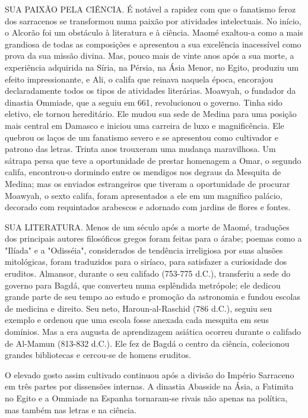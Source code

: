 \documentclass[11pt,a5paper,twoside,openany]{book}
\begin{document}
SUA PAIXÃO PELA CIÊNCIA. É notável a rapidez com que o fanatismo feroz dos sarracenos se transformou numa paixão por atividades intelectuais. No início, o Alcorão foi um obstáculo à literatura e à ciência. Maomé exaltou-a como a mais grandiosa de todas as composições e apresentou a sua excelência inacessível como prova da sua missão divina. Mas, pouco mais de vinte anos após a sua morte, a experiência adquirida na Síria, na Pérsia, na Ásia Menor, no Egito, produziu um efeito impressionante, e Ali, o califa que reinava naquela época, encorajou declaradamente todos os tipos de atividades literárias. Moawyah, o fundador da dinastia Ommiade, que a seguiu em 661, revolucionou o governo. Tinha sido eletivo, ele tornou hereditário. Ele mudou sua sede de Medina para uma posição mais central em Damasco e iniciou uma carreira de luxo e magnificência. Ele quebrou os laços de um fanatismo severo e se apresentou como cultivador e patrono das letras. Trinta anos trouxeram uma mudança maravilhosa. Um sátrapa persa que teve a oportunidade de prestar homenagem a Omar, o segundo califa, encontrou-o dormindo entre os mendigos nos degraus da Mesquita de Medina; mas os enviados estrangeiros que tiveram a oportunidade de procurar Moawyah, o sexto califa, foram apresentados a ele em um magnífico palácio, decorado com requintados arabescos e adornado com jardins de flores e fontes.

SUA LITERATURA. Menos de um século após a morte de Maomé, traduções dos principais autores filosóficos gregos foram feitas para o árabe; poemas como a "Ilíada" e a "Odisséia", considerados de tendência irreligiosa por suas alusões mitológicas, foram traduzidos para o siríaco, para satisfazer a curiosidade dos eruditos. Almansor, durante o seu califado (753-775 d.C.), transferiu a sede do governo para Bagdá, que converteu numa esplêndida metrópole; ele dedicou grande parte de seu tempo ao estudo e promoção da astronomia e fundou escolas de medicina e direito. Seu neto, Haroun-al-Raschid (786 d.C.), seguiu seu exemplo e ordenou que uma escola fosse anexada cada mesquita em seus domínios. Mas a era augusta de aprendizagem asiática ocorreu durante o califado de Al-Mamun (813-832 d.C.). Ele fez de Bagdá o centro da ciência, colecionou grandes bibliotecas e cercou-se de homens eruditos.

O elevado gosto assim cultivado continuou após a divisão do Império Sarraceno em três partes por dissensões internas. A dinastia Abasside na Ásia, a Fatimita no Egito e a Ommiade na Espanha tornaram-se rivais não apenas na política, mas também nas letras e na ciência.
\end{document}
